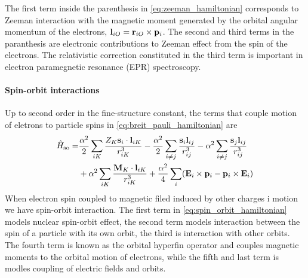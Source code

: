     The first term inside the parenthesis in \autoref{eq:zeeman_hamiltonian} corresponds to
    Zeeman interaction with the magnetic moment generated by the orbital angular momentum of
    the electrons, $\vb{l}_{iO} = \vb{r}_{iO} \times \vb{p}_i$. The second and third terms 
    in the paranthesis are electronic contributions to Zeeman effect from the spin of the 
    electrons. The relativistic correction constituted in the third term is important in
    electron paramegnetic resonance (EPR) spectroscopy.

    \paragraph{Spin-orbit interactions}
    Up to second order in the fine-structure constant, the terms that couple motion of eletrons 
    to particle spins in \autoref{eq:breit_pauli_hamiltonian} are
    \begin{equation}
        \begin{aligned}
            \label{eq:spin_orbit_hamiltonian}
            \hat{H}_{\text{so}}
                =& \frac{\alpha^2}{2} \sum_{iK} \frac{Z_K\vb{s}_i \cdot \vb{l}_{iK}}
                        {r^3_{iK}}
                    - \frac{\alpha^2}{2}\sum_{i \neq j} \frac{\vb{s}_i \vb{l}_{ij}}
                        {r^3_{ij}}
                    - \alpha^2 \sum_{i \neq j} \frac{\vb{s}_j \vb{l}_{ij}}
                        {r^3_{ij}} \\
                &+ \alpha^2 \sum_{iK} \frac{\vb{M}_K \cdot \vb{l}_{iK}}{r^3_{iK}}
                    + \frac{\alpha^2}{4} \sum_i (\vb{E}_i \times \vb{p}_i - \vb{p}_i\times\vb{E}_i)
        \end{aligned}
    \end{equation}
    When electron spin coupled to magnetic filed induced by other charges i motion we have spin-orbit 
    interaction. The first term in \autoref{eq:spin_orbit_hamiltonian} models nuclear spin-orbit effect, 
    the second term models interaction between the spin of a particle with its own orbit, 
    the third is interaction with other orbits. The fourth term is known as the orbital hyperfin
    operator and couples magnetic moments to the 
    orbital motion of electrons, while the fifth and last term is modles coupling of electric fields 
    and orbits.

